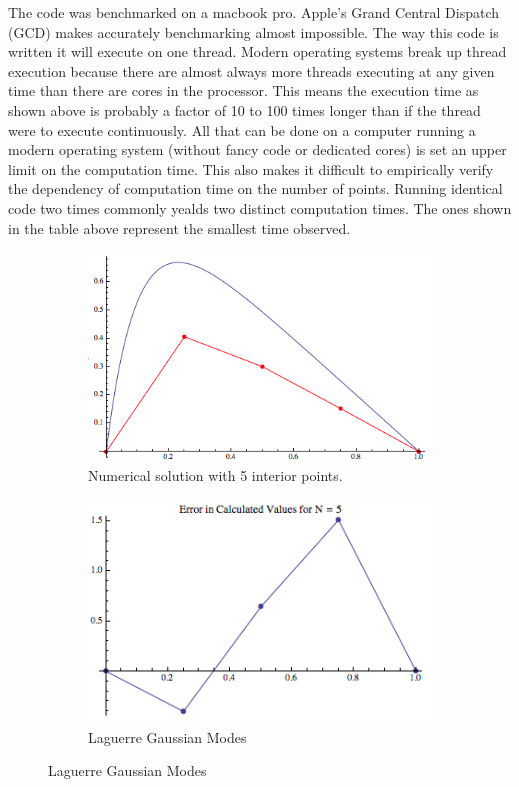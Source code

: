 \documentclass{article}
\begin{document}
The code was benchmarked on a macbook pro.  Apple’s Grand Central Dispatch (GCD) makes accurately benchmarking almost impossible.  The way this code is written it will execute on one thread.  Modern operating systems break up thread execution because there are almost always more threads executing at any given time than there are cores in the processor.  This means the execution time as shown above is probably a factor of 10 to 100 times longer than if the thread were to execute continuously.  All that can be done on a computer running a modern operating system (without fancy code or dedicated cores) is set an upper limit on the computation time.  This also makes it difficult to empirically verify the dependency of computation time on the number of points.  Running identical code two times commonly yealds two distinct computation times.  The ones shown in the table above represent the smallest time observed.

\begin{figure}[H]
	\centering
	\begin{subfigure}{.5\textwidth}
  		\centering
  		\includegraphics[width=.9\linewidth]{solutionN5}
  		\caption{Numerical solution with 5 interior points. \label{fig: hermite gaussian modes}}
	\end{subfigure}%
	\begin{subfigure}{.5\textwidth}
  		\centering
  		\includegraphics[width=.9\linewidth]{solutionErrorN5}
  		\caption{Laguerre Gaussian Modes \label{fig:  laguerre gaussian modes}}
	\end{subfigure}
	
\end{figure}
\end{document}
